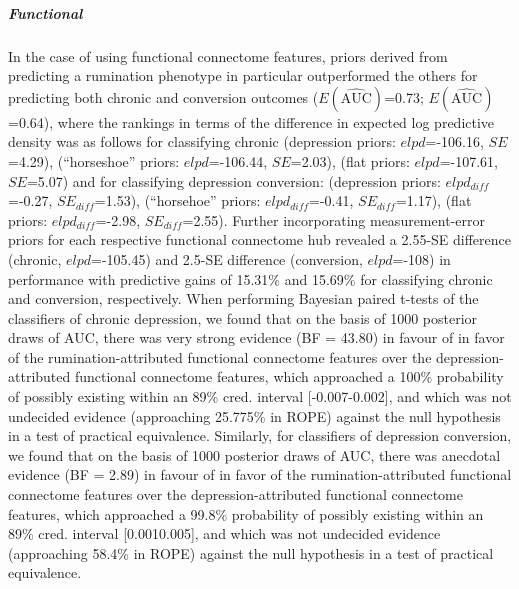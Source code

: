 \documentclass[
  notitlepage]{article}
\begin{document}
\hypertarget{functional-1}{%
\subparagraph{Functional}\label{functional-1}}
In the case of using functional connectome features, priors derived from
predicting a rumination phenotype in particular outperformed the others
for predicting both chronic and conversion outcomes
(\(\mathrm{\textit{E}}(\mathrm{\hat{\text{AUC}}})\)=0.73;
\(\mathrm{\textit{E}}(\mathrm{\hat{\text{AUC}}})\)=0.64), where the
rankings in terms of the difference in expected log predictive density
was as follows for classifying chronic (depression priors:
\(elpd\)=-106.16, \(SE\)=4.29), (``horseshoe'' priors: \(elpd\)=-106.44,
\(SE\)=2.03), (flat priors: \(elpd\)=-107.61, \(SE\)=5.07) and for
classifying depression conversion: (depression priors:
\(elpd_{diff}\)=-0.27, \(SE_{diff}\)=1.53), (``horsehoe'' priors:
\(elpd_{diff}\)=-0.41, \(SE_{diff}\)=1.17), (flat priors:
\(elpd_{diff}\)=-2.98, \(SE_{diff}\)=2.55). Further incorporating
measurement-error priors for each respective functional connectome hub
revealed a 2.55-SE difference (chronic, \(elpd\)=-105.45) and 2.5-SE
difference (conversion, \(elpd\)=-108) in performance with predictive
gains of 15.31\% and 15.69\% for classifying chronic and conversion,
respectively. When performing Bayesian paired t-tests of the classifiers
of chronic depression, we found that on the basis of 1000 posterior
draws of AUC, there was very strong evidence (BF = 43.80) in favour of
in favor of the rumination-attributed functional connectome features
over the depression-attributed functional connectome features, which
approached a 100\% probability of possibly existing within an 89\% cred.
interval {[}-0.007-0.002{]}, and which was not undecided evidence
(approaching 25.775\% in ROPE) against the null hypothesis in a test of
practical equivalence. Similarly, for classifiers of depression
conversion, we found that on the basis of 1000 posterior draws of AUC,
there was anecdotal evidence (BF = 2.89) in favour of in favor of the
rumination-attributed functional connectome features over the
depression-attributed functional connectome features, which approached a
99.8\% probability of possibly existing within an 89\% cred. interval
{[}0.0010.005{]}, and which was not undecided evidence (approaching
58.4\% in ROPE) against the null hypothesis in a test of practical
equivalence.
\end{document}
